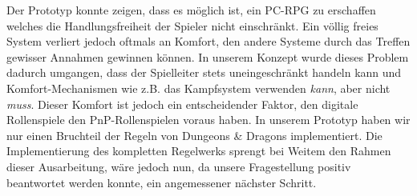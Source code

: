 Der Prototyp konnte zeigen, dass es möglich ist, ein PC-RPG zu erschaffen welches die Handlungsfreiheit der Spieler nicht einschränkt. Ein völlig freies System verliert jedoch oftmals an Komfort, den andere Systeme durch das Treffen gewisser Annahmen gewinnen können. In unserem Konzept wurde dieses Problem dadurch umgangen, dass der Spielleiter stets uneingeschränkt handeln kann und Komfort-Mechanismen wie z.B. das Kampfsystem verwenden \emph{kann}, aber nicht \emph{muss}. Dieser Komfort ist jedoch ein entscheidender Faktor, den digitale Rollenspiele den PnP-Rollenspielen voraus haben. In unserem Prototyp haben wir nur einen Bruchteil der Regeln von Dungeons \& Dragons implementiert. Die Implementierung des kompletten Regelwerks sprengt bei Weitem den Rahmen dieser Ausarbeitung, wäre jedoch nun, da unsere Fragestellung positiv beantwortet werden konnte, ein angemessener nächster Schritt.

